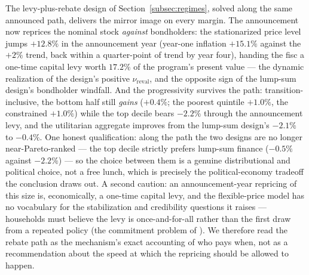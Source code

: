 \documentclass[12pt]{article}
\begin{document}
The levy-plus-rebate design of Section~\ref{subsec:regimes}, solved along
the same announced path, delivers the mirror image on every margin. The
announcement now reprices the nominal stock \emph{against} bondholders:
the stationarized price level jumps $+12.8\%$ in the announcement year
(year-one inflation $+15.1\%$ against the $+2\%$ trend, back within a
quarter-point of trend by year four), handing the fisc a one-time capital
levy worth $17.2\%$ of the program's present value --- the dynamic
realization of the design's positive $\nu_{\mathrm{reval}}$, and the
opposite sign of the lump-sum design's bondholder windfall. And the
progressivity survives the path: transition-inclusive, the bottom half
still \emph{gains} ($+0.4\%$; the poorest quintile $+1.0\%$, the
constrained $+1.0\%$) while the top decile bears $-2.2\%$ through the
announcement levy, and the utilitarian aggregate improves from the lump-sum
design's $-2.1\%$ to $-0.4\%$. One honest qualification: along the path
the two designs are no longer near-Pareto-ranked --- the top decile
strictly prefers lump-sum finance ($-0.5\%$ against $-2.2\%$) --- so the
choice between them is a genuine distributional and political choice, not
a free lunch, which is precisely the political-economy tradeoff the
conclusion draws out. A second caution: an announcement-year repricing of
this size is, economically, a one-time capital levy, and the flexible-price
model has no vocabulary for the stabilization and credibility questions it
raises --- households must believe the levy is once-and-for-all rather than
the first draw from a repeated policy (the commitment problem of
\citealp{hurtado2023sovereign}). We therefore read the rebate path as the
mechanism's exact accounting of who pays when, not as a recommendation
about the speed at which the repricing should be allowed to happen.
\end{document}
